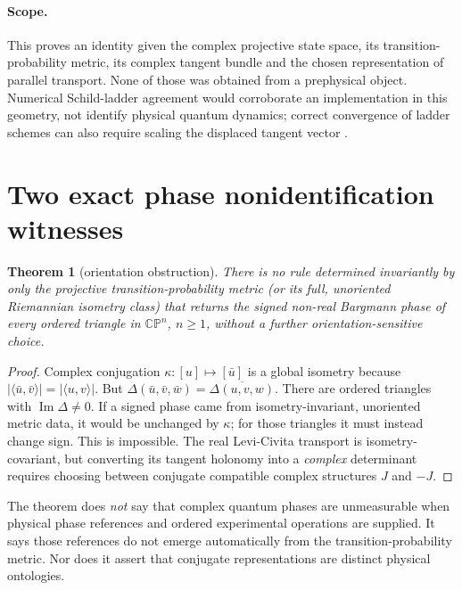 \documentclass[11pt,a4paper]{article}
\newtheorem{theorem}{Theorem}
\newcommand{\CP}{\mathbb{CP}}
\begin{document}
\paragraph{Scope.} This proves an identity given the complex projective state space, its transition-probability metric, its complex tangent bundle and the chosen representation of parallel transport. None of those was obtained from a prephysical object. Numerical Schild-ladder agreement would corroborate an implementation in this geometry, not identify physical quantum dynamics; correct convergence of ladder schemes can also require scaling the displaced tangent vector \cite{guigui}.

\section{Two exact phase nonidentification witnesses}
\begin{theorem}[orientation obstruction]\label{thm:conj}
There is no rule determined invariantly by \emph{only} the projective transition-probability metric (or its full, unoriented Riemannian isometry class) that returns the \emph{signed} non-real Bargmann phase of every ordered triangle in \(\CP^n\), \(n\geq1\), without a further orientation-sensitive choice.
\end{theorem}
\begin{proof}
Complex conjugation \(\kappa:[u]\mapsto[\bar u]\) is a global isometry because
\( |\langle\bar u,\bar v\rangle|=|\langle u,v\rangle|\). But
\(\Delta(\bar u,\bar v,\bar w)=\overline{\Delta(u,v,w)}\). There are ordered triangles with \(\operatorname{Im}\Delta\neq0\). If a signed phase came from isometry-invariant, unoriented metric data, it would be unchanged by \(\kappa\); for those triangles it must instead change sign. This is impossible. The real Levi-Civita transport is isometry-covariant, but converting its tangent holonomy into a \emph{complex} determinant requires choosing between conjugate compatible complex structures \(J\) and \(-J\).
\end{proof}

The theorem does \emph{not} say that complex quantum phases are unmeasurable when physical phase references and ordered experimental operations are supplied. It says those references do not emerge automatically from the transition-probability metric. Nor does it assert that conjugate representations are distinct physical ontologies.
\end{document}
